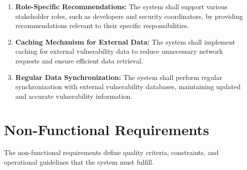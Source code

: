\begin{enumerate}
	\item \label{req:role_specific_recommendations}
	      \textbf{Role-Specific Recommendations:} The system shall support various stakeholder roles, such as developers and security coordinators, by providing recommendations relevant to their specific responsibilities.
	      
	\item \label{req:data_caching_mechanism}
	      \textbf{Caching Mechanism for External Data:} The system shall implement caching for external vulnerability data to reduce unnecessary network requests and ensure efficient data retrieval.
	      
	\item \label{req:data_synchronization}
	      \textbf{Regular Data Synchronization:} The system shall perform regular synchronization with external vulnerability databases, maintaining updated and accurate vulnerability information.
	      
\end{enumerate}

\section{Non-Functional Requirements}
The non-functional requirements define quality criteria, constraints, and operational guidelines that the system must fulfill.

